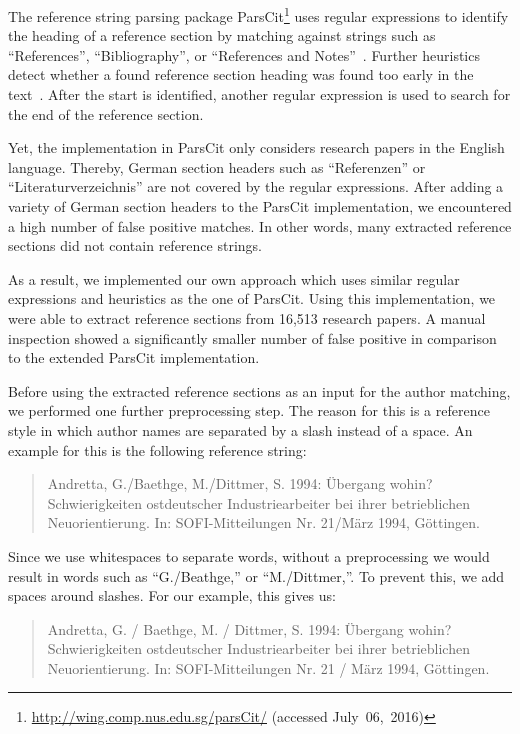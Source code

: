 The reference string parsing package ParsCit\footnote{\url{http://wing.comp.nus.edu.sg/parsCit/} (accessed July~06,~2016)} uses regular expressions to identify the heading of a reference section by matching against strings such as ``References'', ``Bibliography'', or ``References and Notes''~\citep{councill2008parscit}.
Further heuristics detect whether a found reference section heading was found too early in the text~\citep{councill2008parscit}.
After the start is identified, another regular expression is used to search for the end of the reference section.

Yet, the implementation in ParsCit only considers research papers in the English language.
Thereby, German section headers such as ``Referenzen'' or ``Literaturverzeichnis'' are not covered by the regular expressions.
After adding a variety of German section headers to the ParsCit implementation, we encountered a high number of false positive matches.
In other words, many extracted reference sections did not contain reference strings.

As a result, we implemented our own approach which uses similar regular expressions and heuristics as the one of ParsCit.
Using this implementation, we were able to extract reference sections from 16,513 research papers.
A manual inspection showed a significantly smaller number of false positive in comparison to the extended ParsCit implementation.

\bigskip

Before using the extracted reference sections as an input for the author matching, we performed one further preprocessing step.
The reason for this is a reference style in which author names are separated by a slash instead of a space.
An example for this is the following reference string:
\begin{quote}
  Andretta, G./Baethge, M./Dittmer, S. 1994: Übergang wohin? Schwierigkeiten ostdeutscher Industriearbeiter bei ihrer betrieblichen Neuorientierung. In: SOFI-Mitteilungen Nr. 21/März 1994, Göttingen.
\end{quote}
Since we use whitespaces to separate words, without a preprocessing we would result in words such as ``G./Beathge,{}'' or ``M./Dittmer,{}''.
To prevent this, we add spaces around slashes.
For our example, this gives us:
\begin{quote}
  Andretta, G. / Baethge, M. / Dittmer, S. 1994: Übergang wohin? Schwierigkeiten ostdeutscher Industriearbeiter bei ihrer betrieblichen Neuorientierung. In: SOFI-Mitteilungen Nr. 21 / März 1994, Göttingen.
\end{quote}

